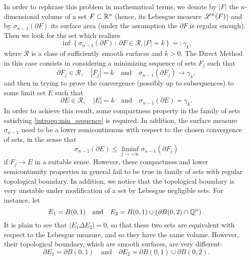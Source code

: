 In order to rephrase this problem in mathematical terms, we denote by $|F|$ the $n$-dimensional volume of a set $F \subset \mathbb{R}^{n}$ (hence, its Lebesgue measure $\mathscr{L}^{n}(F)$) and by $\sigma_{n-1}(\partial F)$ its surface area (under the assumption the $\partial F$ is regular enough). Then we look for the set which realizes
\[
\inf \left\{\sigma_{n-1}(\partial F) \,:\, \partial F \in \mathcal{R}, |F| =
k \right\} =: \gamma_{k},
\]
where $\mathcal{R}$ is a class of sufficiently smooth surfaces and $k > 0$. The Direct Method in this case consists in considering a minimizing sequence of sets $F_{j}$ such that 
\begin{equation} \label{introeq:min_sequence}
\partial F_{j} \in \mathcal{R}, \quad |F_{j}| = k \quad \text{and} \quad \sigma_{n - 1}(\partial F_{j}) \to \gamma_{k},
\end{equation}
and then in trying to prove the convergence (possibly up to subsequences) to some limit set $E$ such that 
\begin{equation*}
\partial E \in \mathcal{R}, \quad |E| = k \quad \text{and} \quad \sigma_{n - 1}(\partial E) = \gamma_{k}.
\end{equation*}
In order to achieve this result, some compactness property in the family of sets satisfying \eqref{introeq:min_sequence} is required. In addition, the surface measure $\sigma_{n - 1}$ need to be a lower semicontinuous with respect to the chosen convergence of sets, in the sense that
\begin{equation*}
\sigma_{n - 1}(\partial E) \le \liminf_{j \to + \infty} \sigma_{n - 1}(\partial F_{j})
\end{equation*}
if $F_{j} \to E$ in a suitable sense.
However, these compactness and lower semicontinuity properties in general fail to be true in family of sets with regular topological boundary. In addition, we notice that the topological boundary is very unstable under modification of a set by Lebesgue negligible sets. For instance, let 
\begin{equation*}
E_{1} = B(0, 1) \quad \text{and} \quad E_{2} = B(0, 1) \cup \left ( \partial B(0, 2) \cap \mathbb{Q}^{n}\right ).
\end{equation*}
It is plain to see that $|E_{1} \Delta E_{2}| = 0$, so that these two sets are equivalent with respect to the Lebesgue measure, and so they have the same volume. However, their topological boundary, which are smooth surfaces, are very different:
\begin{equation*}
\partial E_{1} = \partial B(0, 1) \quad \text{and} \quad \partial E_{2} = \partial B(0, 1) \cup \partial B(0, 2).
\end{equation*} 
